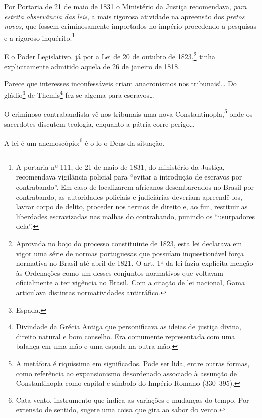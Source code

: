 Por Portaria de 21 de maio de 1831 o Ministério da Justiça recomendava,
\emph{para estrita observância das leis}, a mais rigorosa atividade na
apreensão dos \emph{pretos novos}, que fossem criminosamente importados
no império procedendo a pesquisas e a rigoroso inquérito.\footnote{A
  portaria nº 111, de 21 de maio de 1831, do ministério da Justiça, recomendava
  vigilância policial para ``evitar a introdução de escravos por
  contrabando''. Em caso de localizarem africanos desembarcados no Brasil
  por contrabando, as autoridades policiais e judiciárias deveriam
  apreendê-los, lavrar corpo de delito, proceder nos termos de
  direito e, ao fim, restituir as liberdades escravizadas nas malhas
  do contrabando, punindo os ``usurpadores dela''.}

E o Poder Legislativo, já por a Lei de 20 de outubro de 1823,\footnote{
  Aprovada no bojo do processo constituinte de 1823, esta lei declarava
  em vigor uma série de normas portuguesas que possuíam inquestionável
  força normativa no Brasil até abril de 1821. O art. 1º da lei fazia
  explícita menção às Ordenações como um desses conjuntos normativos que
  voltavam oficialmente a ter vigência no Brasil. Com a citação de lei
  nacional, Gama articulava distintas normatividades
  antitráfico.} tinha
explicitamente admitido aquela de 26 de janeiro de 1818.

Parece que interesses inconfessáveis criam anacronismos nos
tribunais!\ldots{} Do gládio\footnote{Espada.} de Themis\footnote{
  Divindade da Grécia Antiga que personificava as ideias de justiça
  divina, direito natural e bom conselho. Era comumente representada com
  uma balança em uma mão e uma espada na outra mão.} fez-se algema para
escravos\ldots{}

O criminoso contrabandista vê nos tribunais uma nova Constantinopla,\footnote{A metáfora é riquíssima em significados. Pode ser lida, 
  entre outras formas, como referência ao expansionismo desordenado
  associado à assunção de Constantinopla como capital e símbolo do
  Império Romano (330--395).} onde os sacerdotes discutem teologia,
enquanto a pátria corre perigo\ldots{}

A lei é um anemoscópio;\footnote{Cata-vento, instrumento que indica as
  variações e mudanças do tempo. Por extensão de sentido, sugere uma
  coisa que gira ao sabor do vento.} é o-lo o Deus da situação.

